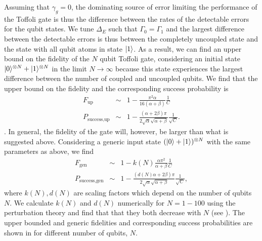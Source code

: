 Assuming that $\gamma_{g}=0$, the dominating source of error limiting the
performance of the Toffoli gate is thus the difference between the rates of the
detectable errors for the qubit states. We tune $\Delta_{E}$ such that
$\Gamma_{0}=\Gamma_{1}$ and the largest difference between the detectable errors
is thus between the completely uncoupled state and the state with all qubit
atoms in state $| 1 \rangle$. As a result, we can find an upper bound on the
fidelity of the $N$ qubit Toffoli gate, considering an initial state
$| 0 \rangle^{\otimes N}+| 1 \rangle^{\otimes N}$ in the limit $N\to\infty$ because this
state experiences the largest difference between the number of coupled and
uncoupled qubits. We find that the upper bound on the fidelity and the
corresponding success probability is
\begin{eqnarray}
F_{\text{up}}&\sim&1-\frac{\pi^{2}\alpha}{16(\alpha+\beta)}\frac{1}{C}\\
P_{\text{success,up}}&\sim&1-
\frac{(\alpha+2\beta)\pi}{2\sqrt{\alpha}\sqrt{\alpha+\beta}} \frac{1}{\sqrt{C}}.
\end{eqnarray}.   
In general, the fidelity of the gate will, however, be larger than what is
suggested above. Considering a generic input state  $(| 0 \rangle+| 1 \rangle)^{\otimes
N}$ with the same parameters as above, we find
\begin{eqnarray}
F_{\text{gen}}&\sim&1-k(N)\frac{\alpha \pi^{2}}{\alpha+\beta}\frac{1}{C} \\
P_{\text{success,gen}}&\sim&1-\frac{(d(N)\alpha+2\beta)\pi}{2\sqrt{\alpha}\sqrt{\alpha+\beta}}
\frac{1}{\sqrt{C}},
\end{eqnarray}
where $k(N),d(N)$ are scaling factors which depend on the number of qubits $N$.
We calculate $k(N)$ and $d(N)$ numerically for $N=1-100$ using the perturbation
theory and find that that they both decrease with $N$ (see
). The upper bounded and generic fidelities and
corresponding success probabilities are shown in  for
different number of qubits, $N$.
